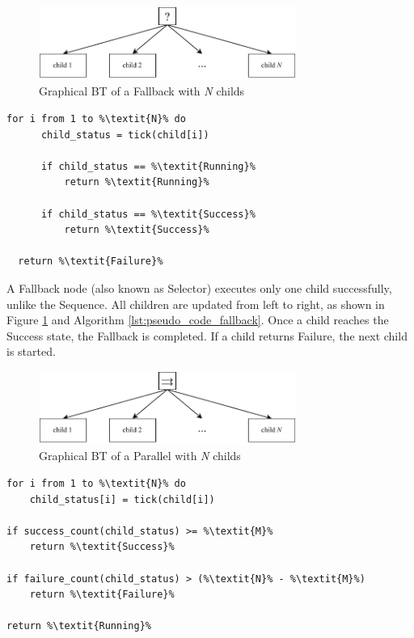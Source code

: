 \begin{figure}[h]
    \centering
    \includegraphics[width=0.75\textwidth]{figures/20_state_of_the_art/fallback.pdf}
    \caption{Graphical BT of a Fallback with \textit{N} childs}
    \label{fig:fallback}
  \end{figure}
  
  \begin{lstlisting}[float=h]
  for i from 1 to %\textit{N}% do
      child_status = tick(child[i])
      
      if child_status == %\textit{Running}%
          return %\textit{Running}%
          
      if child_status == %\textit{Success}%
          return %\textit{Success}%
  
  return %\textit{Failure}%
  \end{lstlisting}

  A Fallback node (also known as Selector) executes only one child successfully, unlike the Sequence. All children are updated from left to right, as shown in Figure \ref{fig:fallback} and Algorithm \ref{lst:pseudo_code_fallback}. Once a child reaches the Success state, the Fallback is completed. If a child returns Failure, the next child is started.

\begin{figure}[h]
    \centering
    \includegraphics[width=0.75\textwidth]{figures/20_state_of_the_art/parallel.pdf}
    \caption{Graphical BT of a Parallel with \textit{N} childs}
    \label{fig:parallel}
\end{figure}
  
\begin{lstlisting}[float=h]
for i from 1 to %\textit{N}% do
    child_status[i] = tick(child[i])
    
if success_count(child_status) >= %\textit{M}%
    return %\textit{Success}%
        
if failure_count(child_status) > (%\textit{N}% - %\textit{M}%)
    return %\textit{Failure}%

return %\textit{Running}%
\end{lstlisting}

